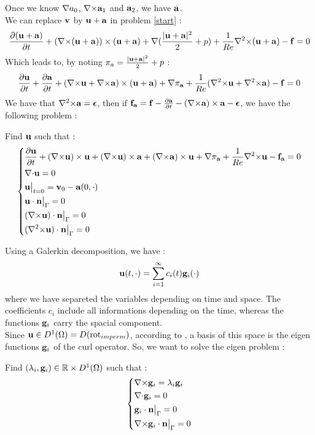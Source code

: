 Once we know ${\nabla} a_0$, ${\nabla\times}{\mathbf{a}}_1$ and ${\mathbf{a}}_2$, we have ${\mathbf{a}}$.\\

We can replace ${\mathbf{v}}$ by ${\mathbf{u}}+{\mathbf{a}}$ in problem \ref{start} :
\[ \frac{\partial({\mathbf{u}}+{\mathbf{a}})}{\partial t}+({\nabla\times}({\mathbf{u}}+{\mathbf{a}}))\times({\mathbf{u}}+{\mathbf{a}}) + {\nabla} (\frac{|{\mathbf{u}}+{\mathbf{a}}|^2}{2}+p) + \frac{1}{Re}{\nabla^2\times}({\mathbf{u}}+{\mathbf{a}}) - {\mathbf{f}} = 0 \]
Which leads to, by noting $\pi_a=\frac{|{\mathbf{u}}+{\mathbf{a}}|^2}{2}+p$ :
\[ \frac{\partial {\mathbf{u}}}{\partial t}+\frac{\partial {\mathbf{a}}}{\partial t} + ({\nabla\times} {\mathbf{u}}+{\nabla\times} {\mathbf{a}})\times({\mathbf{u}}+{\mathbf{a}}) + {\nabla}\pi_{{\mathbf{a}}} + \frac{1}{Re}({\nabla^2\times} {\mathbf{u}}+{\nabla^2\times} {\mathbf{a}}) - {\mathbf{f}} = 0 \]
We have that ${\nabla^2\times} {\mathbf{a}} = \bm{\epsilon}$, then if ${\mathbf{f_a}}={\mathbf{f}}-\frac{\partial {\mathbf{a}}}{\partial t} - ({\nabla\times} {\mathbf{a}})\times {\mathbf{a}} - \bm{\epsilon}$, we have the following problem :
\begin{pb}\label{pbu}
Find ${\mathbf{u}}$ such that :
\begin{equation*}
\left\{\begin{aligned}
&\frac{\partial {\mathbf{u}}}{\partial t} + ({\nabla\times} {\mathbf{u}})\times {\mathbf{u}} + ({\nabla\times} {\mathbf{u}})\times {\mathbf{a}} +({\nabla\times} {\mathbf{a}})\times {\mathbf{u}} + {\nabla} \pi_{{\mathbf{a}}} +\frac{1}{Re}{\nabla^2\times}  {\mathbf{u}} - {\mathbf{f_a}} = 0\\
&{\nabla\cdot} {\mathbf{u}} = 0\\
&{\mathbf{u}}\big\rvert_{t=0} = {\mathbf{v}}_0 - {\mathbf{a}}(0,\cdot)\\
&{\mathbf{u}}\cdot {\mathbf{n}}{\big\rvert_{\Gamma}} = 0\\
&({\nabla\times} {\mathbf{u}})\cdot {\mathbf{n}}{\big\rvert_{\Gamma}} = 0\\
&({\nabla^2\times}  {\mathbf{u}})\cdot {\mathbf{n}}{\big\rvert_{\Gamma}} = 0
\end{aligned}\right.
\end{equation*}\end{pb}

Using a Galerkin decomposition, we have :
\begin{equation}\label{u}
{\mathbf{u}}(t,\cdot) = \sum_{i=1}^{\infty} c_i(t){\mathbf{g}}_i(\cdot)
\end{equation}
where we have separeted the variables depending on time and space. The coefficients $c_i$ include all informations depending on the time, whereas the functions ${\mathbf{g}}_i$ carry the spacial component.\\

Since ${\mathbf{u}}\in D^1(\Omega)=D(\mathrm{rot}_{imperm})$, according to \cite{Penel2004}, a basis of this space is the eigen functions ${\mathbf{g}}_i$ of the curl operator.
So, we want to solve the eigen problem :
\begin{pb}\label{pbcurl}
Find $(\lambda_i,{\mathbf{g}}_i)\in{\mathbb{R}}\times D^1(\Omega)$ such that :
\begin{equation*}
\left\{\begin{aligned}
&{\nabla\times}  {\mathbf{g}}_i = \lambda_i {\mathbf{g}}_i\\
&{\nabla\cdot}{\mathbf{g}}_i = 0\\
&{\mathbf{g}}_i\cdot {\mathbf{n}}{\big\rvert_{\Gamma}} = 0\\
&{\nabla\times} {\mathbf{g}}_i\cdot {\mathbf{n}}{\big\rvert_{\Gamma}} = 0
\end{aligned}\right.
\end{equation*}\end{pb}

